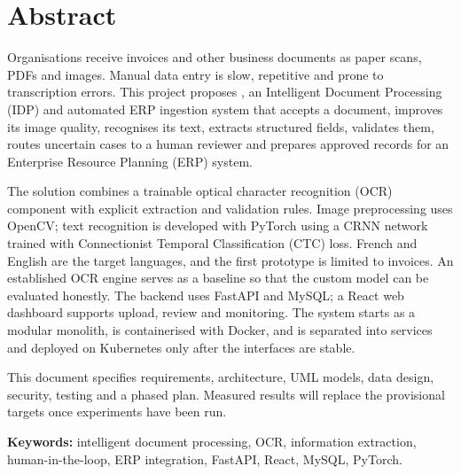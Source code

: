 \chapter*{Abstract}
Organisations receive invoices and other business documents as paper scans, PDFs and images. Manual data entry is slow, repetitive and prone to transcription errors. This project proposes \projname, an Intelligent Document Processing (IDP) and automated ERP ingestion system that accepts a document, improves its image quality, recognises its text, extracts structured fields, validates them, routes uncertain cases to a human reviewer and prepares approved records for an Enterprise Resource Planning (ERP) system.

The solution combines a trainable optical character recognition (OCR) component with explicit extraction and validation rules. Image preprocessing uses OpenCV; text recognition is developed with PyTorch using a CRNN network trained with Connectionist Temporal Classification (CTC) loss. French and English are the target languages, and the first prototype is limited to invoices. An established OCR engine serves as a baseline so that the custom model can be evaluated honestly. The backend uses FastAPI and MySQL; a React web dashboard supports upload, review and monitoring. The system starts as a modular monolith, is containerised with Docker, and is separated into services and deployed on Kubernetes only after the interfaces are stable.

This document specifies requirements, architecture, UML models, data design, security, testing and a phased plan. Measured results will replace the provisional targets once experiments have been run.

\medskip\noindent\textbf{Keywords:} intelligent document processing, OCR, information extraction, human-in-the-loop, ERP integration, FastAPI, React, MySQL, PyTorch.
\clearpage
\tableofcontents
\clearpage
\listoffigures
\clearpage
\listoftables
\clearpage
{}
\setcounter{page}{1}
